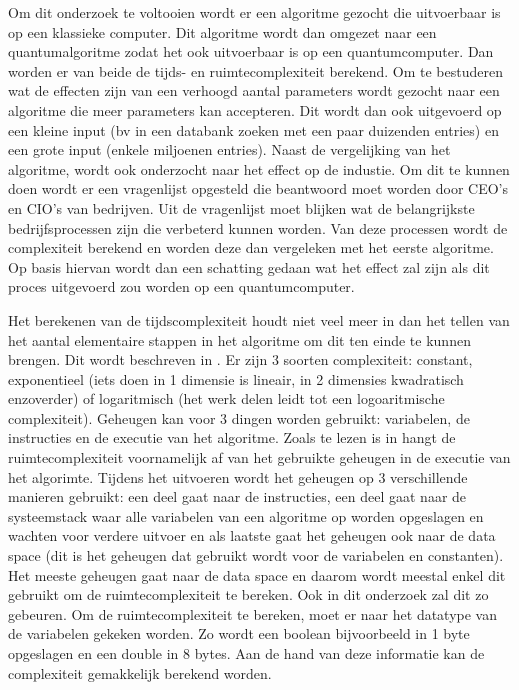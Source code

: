 Om dit onderzoek te voltooien wordt er een algoritme gezocht die uitvoerbaar is op een klassieke computer.
Dit algoritme wordt dan omgezet naar een quantumalgoritme zodat het ook uitvoerbaar is op een quantumcomputer.
Dan worden er van beide de tijds- en ruimtecomplexiteit berekend. Om te bestuderen wat de effecten zijn van een verhoogd
aantal parameters wordt gezocht naar een algoritme die meer parameters kan accepteren. Dit wordt dan ook uitgevoerd op 
een kleine input (bv in een databank zoeken met een paar duizenden entries) en een grote input (enkele miljoenen entries).
Naast de vergelijking van het algoritme, wordt ook onderzocht naar het effect op de industie. Om dit te kunnen doen wordt er een
vragenlijst opgesteld die beantwoord moet worden door CEO's en CIO's van bedrijven. Uit de vragenlijst moet blijken wat
de belangrijkste bedrijfsprocessen zijn die verbeterd kunnen worden. Van deze processen wordt de complexiteit berekend en
worden deze dan vergeleken met het eerste algoritme. Op basis hiervan wordt dan een schatting gedaan wat het effect zal zijn
als dit proces uitgevoerd zou worden op een quantumcomputer. 

Het berekenen van de tijdscomplexiteit houdt niet veel meer in dan het tellen van het aantal elementaire stappen in het algoritme om dit ten einde te kunnen brengen.
Dit wordt beschreven in \textcite{Abhishek2021Tijd}. Er zijn 3 soorten complexiteit: constant, exponentieel (iets doen in 1 dimensie is lineair, in 2 dimensies kwadratisch enzoverder) of logaritmisch (het werk delen leidt tot een logoaritmische complexiteit).
Geheugen kan voor 3 dingen worden gebruikt: variabelen, de instructies en de executie van het algoritme. Zoals te lezen is in \textcite{Abhishek2021Ruimte} hangt de ruimtecomplexiteit voornamelijk af van het gebruikte geheugen in de executie van het algorimte.
Tijdens het uitvoeren wordt het geheugen op 3 verschillende manieren gebruikt: een deel gaat naar de instructies, een deel gaat naar de systeemstack waar alle variabelen van een algoritme op worden opgeslagen en wachten voor verdere uitvoer en als laatste gaat het geheugen ook naar  de data space (dit is het geheugen dat gebruikt wordt voor de variabelen en constanten).
Het meeste geheugen gaat naar de data space en daarom wordt meestal enkel dit gebruikt om de ruimtecomplexiteit te bereken. Ook in dit onderzoek zal dit zo gebeuren.
Om de ruimtecomplexiteit te bereken, moet er naar het datatype van de variabelen gekeken worden. Zo wordt een boolean bijvoorbeeld in 1 byte opgeslagen en een double in 8 bytes. 
Aan de hand van deze informatie kan de complexiteit gemakkelijk berekend worden.


